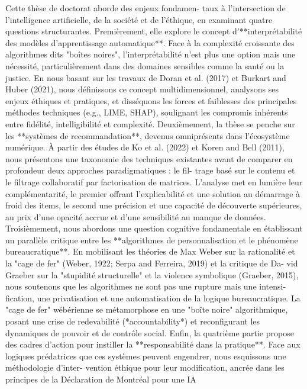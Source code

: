 Cette thèse de doctorat aborde des enjeux fondamen-
taux à l’intersection de l’intelligence artificielle, de la
société et de l’éthique, en examinant quatre questions
structurantes.
Premièrement, elle explore le concept
d’**interprétabilité des modèles d’apprentissage
automatique**. Face à la complexité croissante des
algorithmes dits "boîtes noires", l’interprétabilité n’est
plus une option mais une nécessité, particulièrement
dans des domaines sensibles comme la santé ou la
justice. En nous basant sur les travaux de Doran et al.
(2017) et Burkart and Huber (2021), nous définissons
ce concept multidimensionnel, analysons ses enjeux
éthiques et pratiques, et disséquons les forces et
faiblesses des principales méthodes techniques (e.g.,
LIME, SHAP), soulignant les compromis inhérents
entre fidélité, intelligibilité et complexité.
Deuxièmement, la thèse se penche sur les **systèmes
de recommandation**, devenus omniprésents dans
l’écosystème numérique. À partir des études de Ko et al.
(2022) et Koren and Bell (2011), nous présentons une
taxonomie des techniques existantes avant de comparer
en profondeur deux approches paradigmatiques : le fil-
trage basé sur le contenu et le filtrage collaboratif par
factorisation de matrices. L’analyse met en lumière leur
complémentarité, le premier offrant l’explicabilité et
une solution au démarrage à froid des items, le second
une précision et une capacité de découverte supérieures,
au prix d’une opacité accrue et d’une sensibilité au
manque de données.
Troisièmement, nous abordons une question cognitive
fondamentale en établissant un parallèle critique entre
les **algorithmes de personnalisation et le phénomène
bureaucratique**. En mobilisant les théories de Max
Weber sur la rationalité et la "cage de fer" (Weber,
1922; Serpa and Ferreira, 2019) et la critique de Da-
vid Graeber sur la "stupidité structurelle" et la violence
symbolique (Graeber, 2015), nous soutenons que les
algorithmes ne sont pas une rupture mais une intensi-
fication, une privatisation et une automatisation de la
logique bureaucratique. La "cage de fer" wébérienne
se métamorphose en une "boîte noire" algorithmique,
posant une crise de redevabilité (*accountability*) et
reconfigurant les dynamiques de pouvoir et de contrôle
social.
Enfin, la quatrième partie propose des cadres d’action
pour instiller la **responsabilité dans la pratique**.
Face aux logiques prédatrices que ces systèmes peuvent
engendrer, nous esquissons une méthodologie d’inter-
vention éthique pour leur modification, ancrée dans les
principes de la Déclaration de Montréal pour une IA
